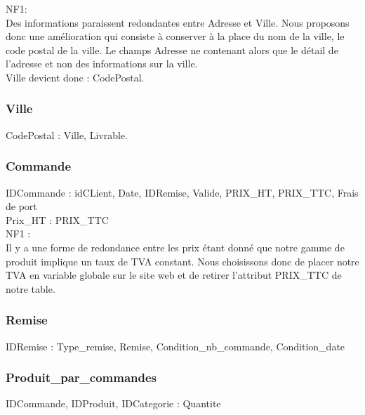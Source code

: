 \documentclass[a4paper, 12pt]{report}
\begin{document}
\begin{spacing}{1.2}
NF1:\\
Des informations paraissent redondantes entre Adresse et Ville. Nous proposons donc une amélioration qui consiste à conserver à la place du nom de la ville, le code postal de la ville. Le champs Adresse ne contenant alors que le détail de l'adresse et non des informations sur la ville.\\
Ville devient donc : CodePostal.

\textcolor{colortitre3}{\subsubsection*{\hypertarget{Ville}{Ville}}}

CodePostal : Ville, Livrable.\\


\textcolor{colortitre3}{\subsubsection*{\hypertarget{Commande}{Commande}}}

IDCommande : idCLient, Date, IDRemise, Valide, PRIX\_HT, PRIX\_TTC, Frais de port\\
Prix\_HT : PRIX\_TTC\\

NF1 : \\
Il y a une forme de redondance entre les prix étant donné que notre gamme de produit implique un taux de TVA constant. Nous choisissons donc de placer notre TVA en variable globale sur le site web et de retirer l'attribut PRIX\_TTC de notre table.\\


\textcolor{colortitre3}{\subsubsection*{\hypertarget{Remise}{Remise}}}

IDRemise : Type\_remise, Remise, Condition\_nb\_commande, Condition\_date\\


\textcolor{colortitre3}{\subsubsection*{\hypertarget{ppc}{Produit\_par\_commandes}}}

IDCommande, IDProduit, IDCategorie : Quantite\\



\end{spacing}
\end{document}
